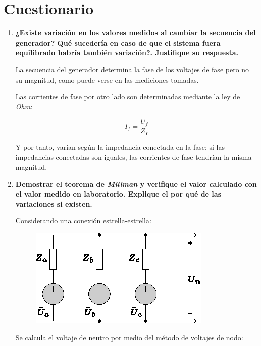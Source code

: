 \documentclass[letter,11pt]{article}
\begin{document}
\section{Cuestionario}

\begin{enumerate}

\item \textbf{¿Existe variación en los valores medidos al cambiar la secuencia
del generador? Qué sucedería en caso de que el sistema fuera equilibrado habría
también variación?. Justifique su respuesta.}

La secuencia del generador determina la fase de los voltajes de fase pero no su
magnitud, como puede verse en las mediciones tomadas.

Las corrientes de fase por otro lado son determinadas mediante la ley de
\emph{Ohm}:

\begin{equation*}
    I_f = \frac{U_f}{Z_Y}
\end{equation*}

Y por tanto, varían según la impedancia conectada en la fase; si las impedancias
conectadas son iguales, las corrientes de fase tendrían la misma magnitud.

\item \textbf{Demostrar el teorema de \emph{Millman} y verifique el valor
calculado con el valor medido en laboratorio. Explique el por qué de las
variaciones si existen.}

Considerando una conexión estrella-estrella:

\begin{figure}[!h]
\centering
\includegraphics[scale=1.4]{figura3.eps}
\end{figure}

Se calcula el voltaje de neutro por medio del método de voltajes de
nodo:


\end{enumerate}
\end{document}
